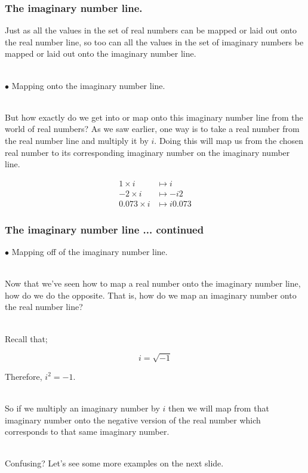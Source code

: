 \begin{frame}
\frametitle{The imaginary number line.}

Just as all the values in the set of real numbers can be mapped or laid out onto the real number line, so too can all the values in the set of imaginary numbers
be mapped or laid out onto the imaginary number line.\\~\

\(\bullet\) Mapping onto the imaginary number line.\\~

But how exactly do we get into or map onto this imaginary number line from the world of real numbers? As we saw earlier, one way is to take a real number from
the real number line and multiply it by \(i\). Doing this will map us from the chosen real number to its corresponding imaginary number on the
imaginary number line.

\begin{align*}
1 \times i     &\mapsto i \\
-2 \times i    &\mapsto -i2 \\
0.073 \times i &\mapsto i0.073
\end{align*}

\end{frame}


\begin{frame}
\frametitle{The imaginary number line ... continued}

\(\bullet\) Mapping off of the imaginary number line.\\~

Now that we've seen how to map a real number onto the imaginary number line, how do we do the opposite. That is, how do we map an imaginary number onto the
real number line?\\~\

Recall that;

\begin{equation}
i = \sqrt{-1}
\end{equation}

Therefore, \(i^{2} = -1\).\\~\

So if we multiply an imaginary number by \(i\) then we will map from that imaginary number onto the negative version of the real number which corresponds to
that same imaginary number.\\~\

Confusing? Let's see some more examples on the next slide.

\end{frame}


